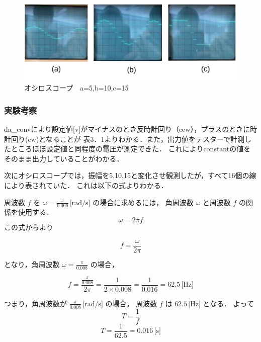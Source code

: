 \begin{figure}[h]
  \centering
  \includegraphics[scale=2]{sozai/5.pdf}
  \caption{オシロスコープ　a=5,b=10,c=15}
\end{figure}

\subsubsection{実験考察}
da\_convにより設定値[v]がマイナスのとき反時計回り（ccw），プラスのときに時計回り(cw)となることが
表3．1よりわかる．また，出力値をテスターで計測したところほぼ設定値と同程度の電圧が測定できた．
これによりconstantの値をそのまま出力していることがわかる．

次にオシロスコープでは，振幅を5,10,15と変化させ観測したが，すべて16個の線により表されていた．
これは以下の式よりわかる．

周波数 \( f \) を \( \omega = \frac{\pi}{0.008} \, \text{[rad/s]} \) の場合に求めるには，
角周波数 \( \omega \) と周波数 \( f \) の関係を使用する．
\begin{equation}
  \omega = 2\pi f
\end{equation}
この式からより

\begin{equation}
  f = \frac{\omega}{2\pi}
\end{equation}

となり，角周波数 \( \omega = \frac{\pi}{0.008} \) の場合，

\begin{equation}
  f = \frac{\frac{\pi}{0.008}}{2\pi} = \frac{1}{2 \times 0.008} = \frac{1}{0.016} = 62.5 \, \text{[Hz]}
\end{equation}

つまり，角周波数が \( \frac{\pi}{0.008} \, \text{[rad/s]} \) の場合，
周波数 \( f \) は \( 62.5 \, \text{[Hz]} \) となる．
よって
\begin{equation}
  T = \frac{1}{f}
\end{equation}
\begin{equation}
  T = \frac{1}{62.5} = 0.016 \, \text{[s]}
\end{equation}

